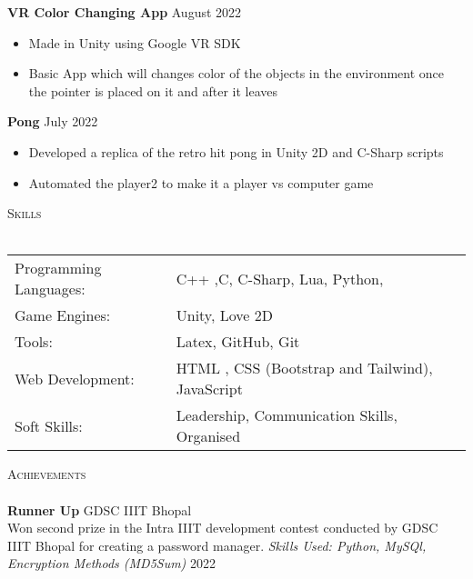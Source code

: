 \documentclass[a4paper]{article}
\newcommand{\lineunder} {
    \vspace*{-8pt} \\
    \hspace*{-18pt} \hrulefill \\
}
\newcommand{\header} [1] {
    {\hspace*{-18pt}\vspace*{6pt} \textsc{#1}}
    \vspace*{-6pt} \lineunder
}
\begin{document}
{\textbf{VR Color Changing App}} \hfill August 2022
\vspace{-1mm}
\begin{itemize} 
	\item Made in Unity using Google VR SDK
        \item Basic App which will changes color of the objects in the environment once the pointer is placed on it and after it leaves
\end{itemize}

{\textbf{Pong}} \hfill July 2022
\vspace{-1mm}
\begin{itemize} 
	\item Developed a replica of the retro hit pong in Unity 2D and C-Sharp scripts
        \item Automated the player2 to make it a player vs computer game
\end{itemize}

\header{Skills}
\vspace{2mm}
\begin{tabular}{ l l }
	Programming Languages: & C++ ,C, C-Sharp, Lua, Python, \\
	\vspace{1mm}
	Game Engines:        & Unity, Love 2D  \\
        Tools:        & Latex, GitHub, Git\\  
	Web Development:       & HTML , CSS (Bootstrap and Tailwind), JavaScript   \\
	Soft Skills:           &  Leadership, Communication Skills, Organised  \\
	
\end{tabular}

\vspace{2mm}
\header{Achievements}
\textbf{Runner Up} \hfill GDSC IIIT Bhopal\\
Won second prize in the Intra IIIT development contest conducted by GDSC IIIT Bhopal for creating a password manager.  
{\textit {Skills Used: Python, MySQl, Encryption Methods (MD5Sum)}}  \hfill 2022\\
\end{document}
